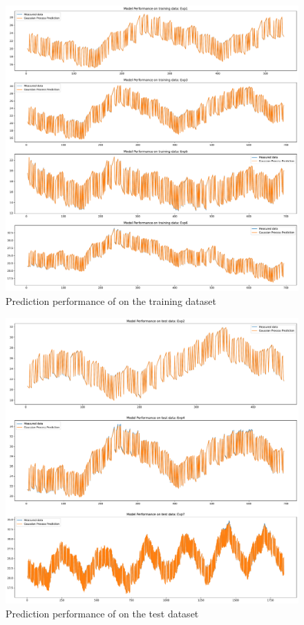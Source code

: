 \begin{figure}[ht]
    \centering
    \includegraphics[width = \textwidth]{Plots/SVGP_123_training_performance.pdf}
    \caption{Prediction performance of  on the training dataset}
    \label{fig:SVGP_train_validation}
\end{figure}

\begin{figure}[ht]
    \centering
    \includegraphics[width = \textwidth]{Plots/SVGP_123_test_performance.pdf}
    \caption{Prediction performance of  on the test dataset}
    \label{fig:SVGP_test_validation}
\end{figure}

\clearpage
